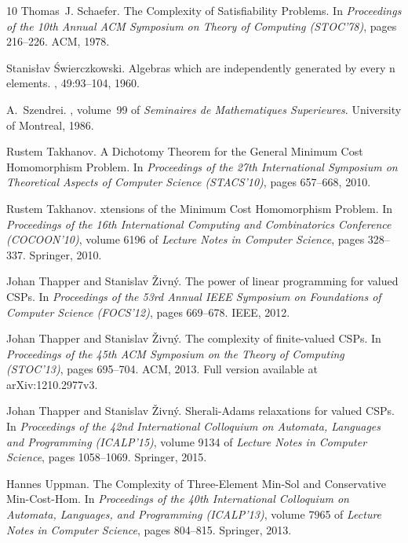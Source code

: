 \documentclass[11pt, reqno]{article}
\theoremstyle{remark}
\begin{document}
\begin{thebibliography}{10}
Thomas~J. Schaefer.
\newblock The {C}omplexity of {S}atisfiability {P}roblems.
\newblock In {\em Proceedings of the 10th {A}nnual {A}{C}{M} {S}ymposium on
  {T}heory of {C}omputing ({S}{T}{O}{C}'78)}, pages 216--226. ACM, 1978.

Stanis\l{}av \'Swierczkowski.
\newblock Algebras which are independently generated by every n elements.
, 49:93--104, 1960.

A.~Szendrei.
, volume~99 of {\em Seminaires
  de Mathematiques Superieures}.
\newblock University of Montreal, 1986.

Rustem Takhanov.
\newblock A {D}ichotomy {T}heorem for the {G}eneral {M}inimum {C}ost
  {H}omomorphism {P}roblem.
\newblock In {\em Proceedings of the 27th International Symposium on
  Theoretical Aspects of Computer Science (STACS'10)}, pages 657--668, 2010.

Rustem Takhanov.
xtensions of the {M}inimum {C}ost {H}omomorphism {P}roblem.
\newblock In {\em Proceedings of the 16th International Computing and
  Combinatorics Conference (COCOON'10)}, volume 6196 of {\em Lecture Notes in
  Computer Science}, pages 328--337. Springer, 2010.

Johan Thapper and Stanislav {\v{Z}}ivn\'y.
\newblock The power of linear programming for valued {C}{S}{P}s.
\newblock In {\em Proceedings of the 53rd Annual IEEE Symposium on Foundations
  of Computer Science (FOCS'12)}, pages 669--678. IEEE, 2012.

Johan Thapper and Stanislav {\v{Z}}ivn\'y.
\newblock The complexity of finite-valued {C}{S}{P}s.
\newblock In {\em Proceedings of the 45th ACM Symposium on the Theory of
  Computing (STOC'13)}, pages 695--704. ACM, 2013.
\newblock Full version available at arXiv:1210.2977v3.

Johan Thapper and Stanislav {\v{Z}}ivn\'y.
\newblock Sherali-{A}dams relaxations for valued {C}{S}{P}s.
\newblock In {\em Proceedings of the 42nd International Colloquium on Automata,
  Languages and Programming (ICALP'15)}, volume 9134 of {\em Lecture Notes in
  Computer Science}, pages 1058--1069. Springer, 2015.

Hannes Uppman.
\newblock The {C}omplexity of {T}hree-{E}lement {M}in-{S}ol and {C}onservative
  {M}in-{C}ost-{H}om.
\newblock In {\em Proceedings of the 40th International Colloquium on Automata,
  Languages, and Programming (ICALP'13)}, volume 7965 of {\em Lecture Notes in
  Computer Science}, pages 804--815. Springer, 2013.


\end{thebibliography}
\end{document}
